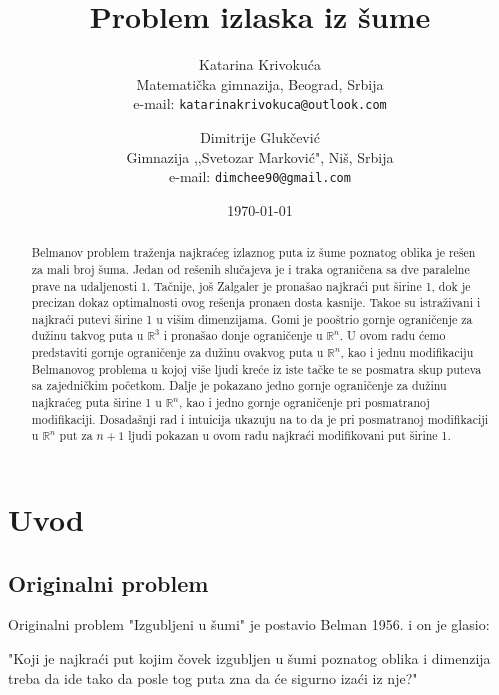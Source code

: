 \documentclass[11pt,letter]{article}
\begin{document}
\title{\bf{Problem izlaska iz \v sume}}

\author{
Katarina Krivoku\'ca \\
Matemati\v cka gimnazija, Beograd, Srbija\\
e-mail: \tt{katarinakrivokuca@outlook.com} \\
\and
Dimitrije Gluk\v cevi\' c \\
Gimnazija ,,Svetozar Markovi\' c", Ni\v s, Srbija \\
e-mail: \tt{dimchee90@gmail.com} \\
}

\date{\today}
\maketitle %

\begin{abstract}
Belmanov problem tra\v zenja najkra\' ceg izlaznog puta iz \v sume poznatog oblika je re\v sen za mali broj \v suma. Jedan od re\v senih slu\v cajeva je i traka ograni\v cena sa dve paralelne prave na udaljenosti 1. Ta\v cnije, jo\v s Zalgaler je prona\v sao najkra\' ci put \v sirine 1, dok je precizan dokaz optimalnosti ovog re\v senja prona\dj en dosta kasnije. Tako\dj e su istra\v zivani i najkra\' ci putevi \v sirine 1 u vi\v sim dimenzijama. Gomi je poo\v strio gornje ograni\v cenje za du\v zinu takvog puta u $\mathbb{R}^3$ i prona\v sao donje ograni\v cenje u $\mathbb{R}^n$. U ovom radu \' cemo predstaviti gornje ograni\v cenje za du\v zinu ovakvog puta u $\mathbb{R}^n$, kao i jednu modifikaciju Belmanovog problema u kojoj vi\v se ljudi kre\' ce iz iste ta\v cke te se posmatra skup puteva sa zajedni\v ckim po\v cetkom. Dalje je pokazano jedno gornje ograni\v cenje za du\v zinu najkra\' ceg puta \v sirine 1 u $\mathbb{R}^n$, kao i jedno gornje ograni\v cenje pri posmatranoj modifikaciji. Dosada\v snji rad i intuicija ukazuju na to da je pri posmatranoj modifikaciji u $\mathbb{R}^n$ put za $n+1$ ljudi pokazan u ovom radu najkra\' ci modifikovani put \v sirine 1.


\end{abstract}

\section[Uvod]{Uvod}
\bigskip
\subsection[Originalni problem]{Originalni problem}
\bigskip
Originalni problem "Izgubljeni u \v sumi" je postavio Belman 1956. i on je glasio:
\begin{center}
"Koji je najkra\' ci put kojim \v covek izgubljen u \v sumi poznatog oblika i dimenzija treba da ide tako da posle tog puta zna da \' ce sigurno iza\' ci iz nje?"
\end{center}
\end{document}
